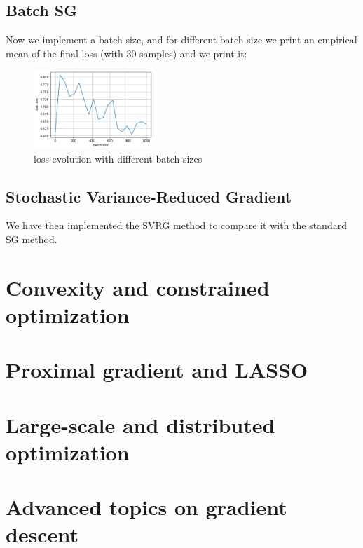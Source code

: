 \documentclass{article}
\begin{document}
    \subsection{Batch SG}

    Now we implement a batch size, and for different batch size we print an empirical mean of the final loss (with 30 samples) and we print it:

    \begin{figure}[!h]
    \centering
    \includegraphics[width=0.4\textwidth]{images/sg2.png}
    \caption{loss evolution with different batch sizes}
    \label{fig:sg1}
    \end{figure}      

    \subsection{Stochastic Variance-Reduced Gradient}

    We have then implemented the SVRG method to compare it with the standard SG method.

    


\section{Convexity and constrained optimization}

\section{Proximal gradient and LASSO}

\section{Large-scale and distributed optimization}

\section{Advanced topics on gradient descent}




\clearpage


\end{document}
